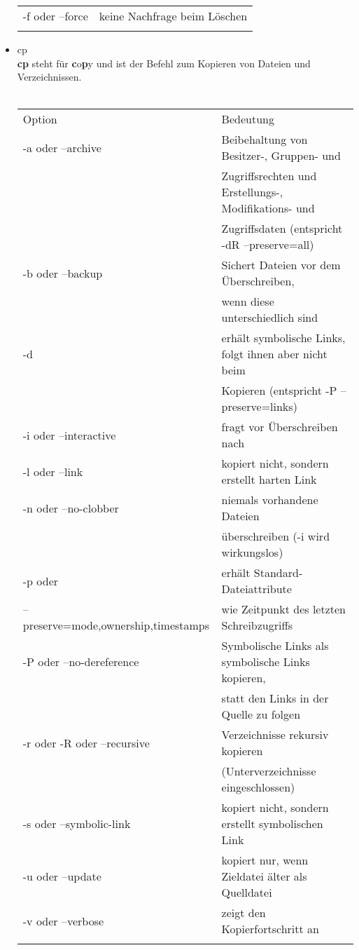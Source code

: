\begin{itemize}
\begin{tabular}{ll}
				-f oder --force & keine Nachfrage beim L\"oschen\\ \\
			\end{tabular}
			\item cp\\
			\textbf{cp} steht für \textbf{c}o\textbf{p}y und ist der Befehl zum Kopieren von Dateien und Verzeichnissen.\\ \\
			\begin{tabular}{ll}
				Option & Bedeutung \\
				-a oder --archive & Beibehaltung von Besitzer-, Gruppen- und\\
				& Zugriffsrechten und Erstellungs-, Modifikations- und\\
				& Zugriffsdaten (entspricht -dR --preserve=all)\\
				-b oder --backup & Sichert Dateien vor dem \"Uberschreiben,\\
				& wenn diese unterschiedlich sind\\
				-d & erh\"alt symbolische Links, folgt ihnen aber nicht beim\\
				& Kopieren (entspricht -P --preserve=links)\\
				-i oder --interactive & fragt vor \"Uberschreiben nach\\
				-l oder --link & kopiert nicht, sondern erstellt harten Link\\
				-n oder --no-clobber & niemals vorhandene Dateien\\
				& \"uberschreiben (-i wird wirkungslos)\\
				-p oder & erh\"alt Standard-Dateiattribute\\
				 --preserve=mode,ownership,timestamps & wie Zeitpunkt des letzten Schreibzugriffs\\
				-P oder --no-dereference & Symbolische Links als symbolische Links kopieren,\\
				& statt den Links in der Quelle zu folgen\\
				-r oder -R oder --recursive & Verzeichnisse rekursiv kopieren\\
				& (Unterverzeichnisse eingeschlossen)\\
				-s oder --symbolic-link & kopiert nicht, sondern erstellt symbolischen Link\\
				-u oder --update & kopiert nur, wenn Zieldatei \"alter als Quelldatei\\
				-v oder --verbose & zeigt den Kopierfortschritt an\\ \\

\end{tabular}
\end{itemize}
